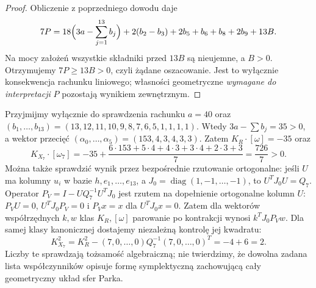 \begin{proof}
Obliczenie z poprzedniego dowodu daje
\[
7P=18\Bigl(3a-\sum_{j=1}^{13}b_j\Bigr)
+2(b_2-b_3)+2b_5+b_6+b_8+2b_9+13B.
\]
Na mocy założeń wszystkie składniki
przed $13B$ są nieujemne, a $B>0$.
Otrzymujemy $7P\ge13B>0$,
czyli żądane oszacowanie.
Jest to wyłącznie konsekwencja
rachunku liniowego; własności
geometryczne \emph{wymagane do
interpretacji} $P$ pozostają
wynikiem zewnętrznym.
\end{proof}

\begin{przyklad}
Przyjmijmy wyłącznie do sprawdzenia rachunku
$a=40$ oraz $(b_1,\ldots,b_{13})=(13,12,11,10,9,8,7,6,5,1,1,1,1)$.
Wtedy $3a-\sum b_j=35>0$, a wektor przecięć
$(\alpha_0,\ldots,\alpha_5)=(153,4,3,4,3,3)$.
Zatem $K_R\cdot[\omega]=-35$ oraz
\[
K_{X_7}\cdot[\omega_7]
 =-35+\frac{6\cdot153+5\cdot4+4\cdot3
                    +3\cdot4+2\cdot3+3}{7}
 =\frac{726}{7}>0.
\]
Można także sprawdzić wynik przez bezpośrednie
rzutowanie ortogonalne: jeśli $U$ ma kolumny $u_i$
w bazie $h,e_1,\ldots,e_{13}$, a
$J_0=\operatorname{diag}(1,-1,\ldots,-1)$,
to $U^TJ_0U=Q_7$. Operator
$P_V=I-UQ_7^{-1}U^TJ_0$ jest rzutem na
dopełnienie ortogonalne kolumn $U$:
$P_VU=0$, $U^TJ_0P_V=0$ i
$P_Vx=x$ dla $U^TJ_0x=0$.
Zatem dla wektorów współrzędnych $k,w$ klas
$K_R,[\omega]$ parowanie po kontrakcji wynosi
$k^TJ_0P_Vw$. Dla samej klasy kanonicznej
dostajemy niezależną kontrolę jej kwadratu:
\[
K_{X_7}^2=K_R^2-(7,0,\ldots,0)Q_7^{-1}
(7,0,\ldots,0)^T=-4+6=2.
\]
Liczby te sprawdzają tożsamość algebraiczną;
nie twierdzimy, że dowolna zadana lista współczynników
opisuje formę symplektyczną zachowującą cały geometryczny
układ sfer Parka.
\end{przyklad}

\begin{center}
\end{center}


